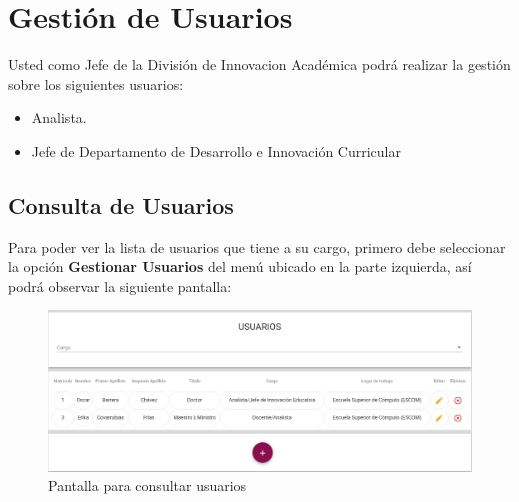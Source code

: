 \clearpage
\section{Gestión de Usuarios}

    Usted como Jefe de la División de Innovacion Académica podrá realizar la gestión sobre los siguientes usuarios:
    \begin{itemize}
        \item Analista.
        \item Jefe de Departamento de Desarrollo e Innovación Curricular
    \end{itemize}


    \subsection{Consulta de Usuarios}
  
  Para poder ver la lista de usuarios que tiene a su cargo, primero debe seleccionar la opción \textbf{Gestionar Usuarios} del menú ubicado en la parte izquierda, así podrá observar la siguiente pantalla:
  
  \begin{figure}[!hbtp]
  	\centering
  	\hypertarget{consultarUs}{\includegraphics[width=0.6\linewidth]{images/SP5/Consultar-Usuario}}
  	\caption{Pantalla para consultar usuarios}
  	\label{consultarrh}
  \end{figure}
  
